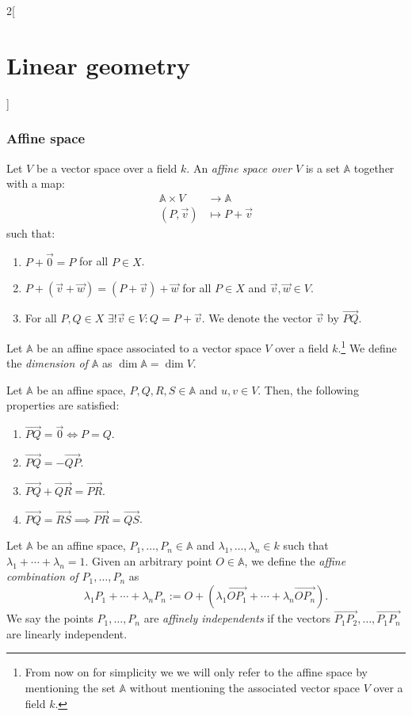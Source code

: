 \documentclass[class=article,10pt,crop=false]{standalone}
\begin{document}
\begin{multicols}{2}[\section{Linear geometry}]
\subsubsection*{Affine space}
\begin{definition}
Let $V$ be a vector space over a field $k$. An \textit{affine space over $V$} is a set $\mathbb{A}$ together with a map:
\begin{align*}
    \mathbb{A}\times V&\rightarrow \mathbb{A}\\
    (P,\vec{v})&\mapsto P+\vec{v}
\end{align*}
such that:
\begin{enumerate}
    \item $P+\vec{0}=P$ for all $P\in X$.
    \item $P+(\vec{v}+\vec{w})=(P+\vec{v})+\vec{w}$ for all $P\in X$ and $\vec{v},\vec{w}\in V$.
    \item For all $P,Q\in X$ $\exists!\vec{v}\in V:Q=P+\vec{v}$. We denote the vector $\vec{v}$ by $\overrightarrow{PQ}$.
\end{enumerate}
\end{definition}
\begin{definition}
Let $\mathbb{A}$ be an affine space associated to a vector space $V$ over a field $k$.\footnote{From now on for simplicity we we will only refer to the affine space by mentioning the set $\mathbb{A}$ without mentioning the associated vector space $V$ over a field $k$.} We define the \textit{dimension of $\mathbb{A}$} as $\dim\mathbb{A}=\dim V$.
\end{definition}
\begin{prop}
Let $\mathbb{A}$ be an affine space, $P,Q,R,S\in\mathbb{A}$ and $u,v\in V$. Then, the following properties are satisfied:
\begin{enumerate}
    \item $\overrightarrow{PQ}=\overrightarrow{0}\iff P=Q$.
    \item $\overrightarrow{PQ}=-\overrightarrow{QP}$.
    \item $\overrightarrow{PQ}+\overrightarrow{QR}=\overrightarrow{PR}$.
    \item $\overrightarrow{PQ}=\overrightarrow{RS}\implies\overrightarrow{PR}=\overrightarrow{QS}$.
\end{enumerate}
\end{prop}
\begin{definition}
Let $\mathbb{A}$ be an affine space, $P_1,\ldots,P_n\in\mathbb{A}$ and $\lambda_1,\ldots,\lambda_n\in k$ such that $\lambda_1+\cdots+\lambda_n=1$. Given an arbitrary point $O\in\mathbb{A}$, we define the \textit{affine combination of $P_1,\ldots,P_n$} as $$\lambda_1P_1+\cdots+\lambda_nP_n:=O+\left(\lambda_1\overrightarrow{OP_1}+\cdots+\lambda_n\overrightarrow{OP_n}\right).$$ We say the points $P_1,\ldots,P_n$ are \textit{affinely independents} if the vectors $\overrightarrow{P_1P_2},\ldots,\overrightarrow{P_1P_n}$ are linearly independent.

\end{definition}
\end{multicols}
\end{document}

